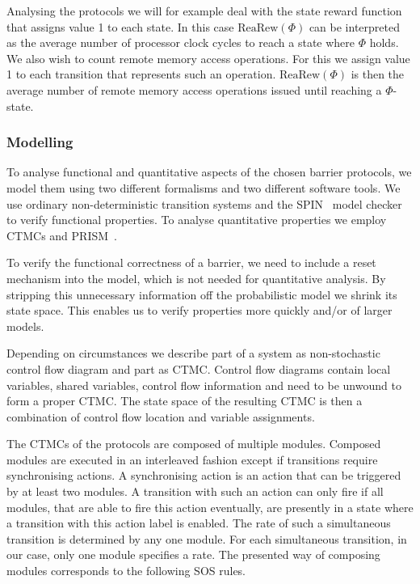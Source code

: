 \documentclass[a4paper, 10pt]{article}
\begin{document}
Analysing the protocols we will for example deal with the state reward function that assigns value 1 to each state. In this case $\mathrm{ReaRew}(\Phi)$ can be interpreted as the average number of processor clock cycles to reach a state where $\Phi$ holds.
We also wish to count remote memory access operations. For this we assign value 1 to each transition that represents such an operation. $\mathrm{ReaRew}(\Phi)$ is then the average number of remote memory access operations issued until reaching a $\Phi$-state.

\subsubsection{Modelling}
\label{sssec:analysis-modelchecking-modelling}
To analyse functional and quantitative aspects of the chosen barrier protocols, we model them using two different formalisms and two different software tools. We use ordinary non-deterministic transition systems and the SPIN~\cite{spin, hol97} model checker to verify functional properties. To analyse quantitative properties we employ CTMCs and PRISM~\cite{prism, knp09}.

To verify the functional correctness of a barrier, we need to include a reset mechanism into the model, which is not needed for quantitative analysis. By stripping this unnecessary information off the probabilistic model we shrink its state space. This enables us to verify properties more quickly and/or of larger models.

Depending on circumstances we describe part of a system as non-stochastic control flow diagram and part as CTMC. Control flow diagrams contain local variables, shared variables, control flow information and need to be unwound to form a proper CTMC. The state space of the resulting CTMC is then a combination of control flow location and variable assignments.

The CTMCs of the protocols are composed of multiple modules.
Composed modules are executed in an interleaved fashion except if transitions require synchronising actions. A synchronising action is an action that can be triggered by at least two modules. A transition with such an action can only fire if all modules, that are able to fire this action eventually, are presently in a state where a transition with this action label is enabled. The rate of such a simultaneous transition is determined by any one module. For each simultaneous transition, in our case, only one module specifies a rate.
The presented way of composing modules corresponds to the following SOS rules.
\end{document}
